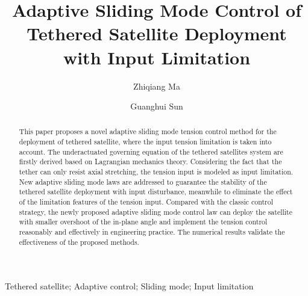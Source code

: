 \documentclass[3p]{elsarticle}
\theoremstyle{plain}
\begin{document}
\begin{frontmatter}
\title{Adaptive Sliding Mode Control of Tethered Satellite  Deployment with Input Limitation}
\author{Zhiqiang Ma}
\author{Guanghui Sun}
\address{Research Institute of Intelligent Control and Systems, Harbin Institute of Technology, Harbin 150001, China}

\begin{abstract}
This paper proposes  a  novel adaptive sliding mode tension control method for  the deployment of tethered satellite, where the input tension limitation is taken into account. The underactuated governing equation of the tethered satellites system are firstly derived based on Lagrangian mechanics theory. Considering the fact that the tether can only resist axial stretching, the tension input is modeled as input limitation. New adaptive sliding mode laws are addressed to guarantee the stability of the tethered satellite deployment with input disturbance, meanwhile to eliminate the effect of the limitation features of the tension input. Compared with the classic control strategy, the newly proposed adaptive sliding mode control law can deploy the satellite with smaller overshoot of the in-plane angle and implement the tension control reasonably and effectively in engineering practice. The numerical results validate the effectiveness of the proposed methods.
\end{abstract}
\begin{keyword}
Tethered satellite;  Adaptive control;  Sliding mode;  Input limitation
\end{keyword}
\end{frontmatter}
\end{document}
